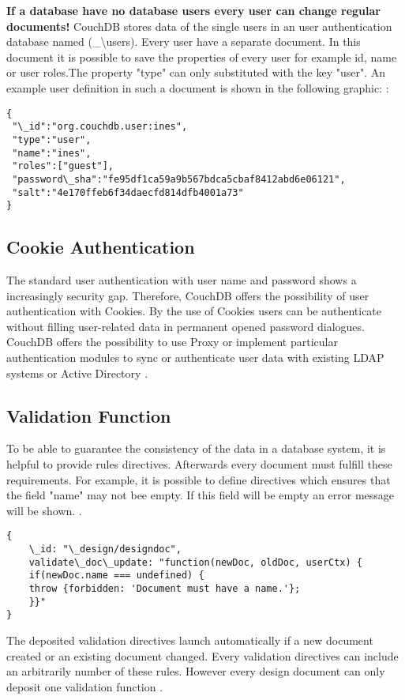 \textbf{If a database have no database users every user can change regular documents!}
CouchDB stores data of the single users in an user authentication database named (\_\textbackslash users). Every user have a separate document. In this document it is possible to save the properties of every user for example id, name or user roles.The property "type" can only substituted with the key "user". An example user definition in such a document is shown in the following graphic: \cite{ApacheSoftwareFoundation.2013.SecurityFeatures}:
\begin{lstlisting}[frame=single, caption=Example User Definition \protect\cite{ApacheSoftwareFoundation.2013.SecurityFeatures}]
{
 "\_id":"org.couchdb.user:ines",
 "type":"user",
 "name":"ines",
 "roles":["guest"],
 "password\_sha":"fe95df1ca59a9b567bdca5cbaf8412abd6e06121",
 "salt":"4e170ffeb6f34daecfd814dfb4001a73"
}
\end{lstlisting} 

\subsection{Cookie Authentication}
The standard user authentication with user name and password shows a increasingly security gap. Therefore, CouchDB offers the possibility of user authentication with Cookies. By the use of Cookies users can be authenticate without filling user-related data in permanent opened password dialogues. 
CouchDB offers the possibility to use Proxy or implement particular authentication modules to sync or authenticate user data with existing LDAP systems or Active Directory \cite{Anderson.2010.Buch}.

\subsection{Validation Function}
To be able to guarantee the consistency of the data in a database system, it is helpful to provide rules directives. Afterwards every document must fulfill these requirements. For example, it is possible to define directives which ensures that the field "name" may not bee empty. If this field will be empty an error message will be shown. \cite{Scheliga.2010}.

\begin{lstlisting}[frame=single, caption=Example Validation Function \protect\cite{Scheliga.2010}]
{
    \_id: "\_design/designdoc",
    validate\_doc\_update: "function(newDoc, oldDoc, userCtx) {
    if(newDoc.name === undefined) {
    throw {forbidden: 'Document must have a name.'};
    }}"
}
\end{lstlisting}

The deposited validation directives launch automatically if a new document created or an existing document changed. Every validation directives can include an arbitrarily number of these rules. However every design document can only deposit one validation function \cite{Scheliga.2010}.



